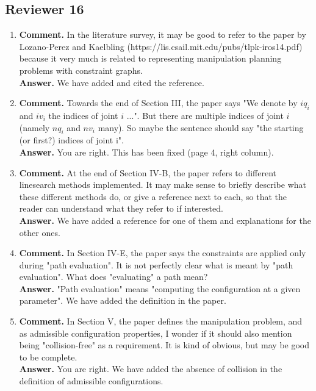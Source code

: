 \documentclass{article}
\begin{document}
\subsection*{Reviewer 16}
\begin{enumerate}
\item \textbf{Comment.} In the literature survey, it may be good to refer to
  the paper by Lozano-Perez and Kaelbling
  (https://lis.csail.mit.edu/pubs/tlpk-iros14.pdf) because it very much is
  related to representing manipulation planning problems with constraint graphs.\\
  \textbf{Answer.} We have added and cited the reference.

\item \textbf{Comment.} Towards the end of Section III, the paper says
  "We denote by $iq_i$ and $iv_i$ the indices of joint $i$ ...". But there
  are multiple indices of joint $i$ (namely $nq_i$ and $nv_i$ many). So
  maybe the sentence should say "the starting (or first?) indices of
  joint i".\\
  \textbf{Answer.} You are right. This has been fixed (page 4, right column).

\item \textbf{Comment.} At the end of Section IV-B, the paper refers
  to different linesearch methods implemented. It may make sense to
  briefly describe what these different methods do, or give a
  reference next to each, so that the reader can understand what they
  refer to if interested.\\
  \textbf{Answer.} We have added a reference for one of them and explanations
  for the other ones.

\item \textbf{Comment.} In Section IV-E, the paper says the
  constraints are applied only during "path evaluation". It is not
  perfectly clear what is meant by "path evaluation". What does
  "evaluating" a path mean?\\
  \textbf{Answer.} "Path evaluation" means "computing the configuration at a
  given parameter". We have added the definition in the paper.

\item \textbf{Comment.} In Section V, the paper defines the
  manipulation problem, and as admissible configuration properties, I
  wonder if it should also mention being "collision-free" as a
  requirement. It is kind of obvious, but may be good to be
  complete.\\
  \textbf{Answer.} You are right. We have added the absence of collision in the
  definition of admissible configurations.


\end{enumerate}
\end{document}

